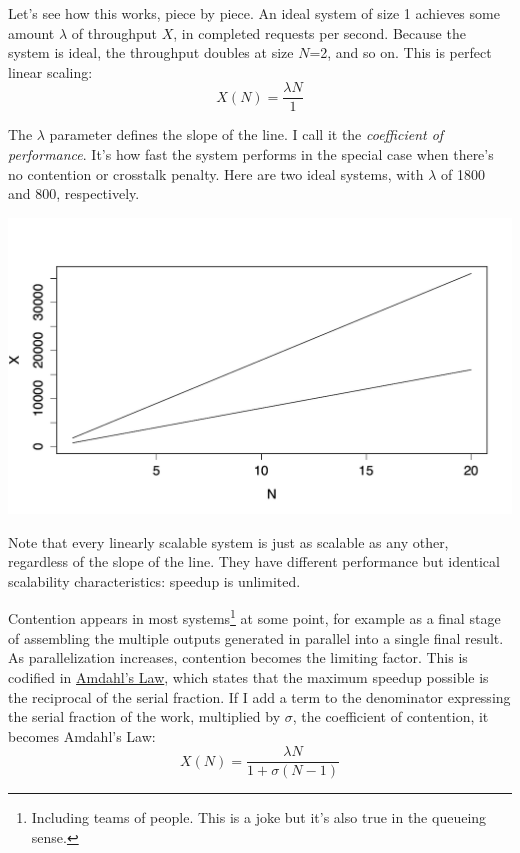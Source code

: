 \documentclass{vivid_layout}
\begin{document}
Let's see how this works, piece by piece. An ideal system of size 1
achieves some amount $\lambda$ of throughput $X$, in completed requests per
second. Because the system is ideal, the throughput doubles at size $N$=2, and so
on. This is perfect linear scaling:
\begin{equation}
X(N) = \frac{\lambda N}{1}
\label{linear}
\end{equation}

The $\lambda$ parameter defines the slope of the line. I call it the {\itshape
coefficient of performance}. It's how fast the system performs in the special
case when there's no contention or crosstalk penalty.
Here are two ideal systems, with $\lambda$ of 1800 and 800, respectively.
\begin{center}
\includegraphics[width=.85\linewidth]{scalability/ideal-linear}
\end{center}

Note that every linearly scalable system is just as scalable as any other,
regardless of the slope of the line. They have different performance but
identical scalability characteristics: speedup is unlimited. 

Contention appears in most systems\footnote{Including teams of people. This is a
joke but it's also true in the queueing sense.} at
some point, for example as a final stage of assembling the multiple outputs
generated in parallel into a single final result. As parallelization increases,
contention becomes the limiting factor. This is codified in
\href{https://en.wikipedia.org/wiki/Amdahl\%27s\_law}{Amdahl's Law}, which
states that the maximum speedup possible is the reciprocal of the serial
fraction. If I add a term to the denominator expressing the serial fraction of
the work, multiplied by $\sigma$, the coefficient of contention, it becomes
Amdahl's Law:
\begin{equation}
X(N) = \frac{\lambda N}{1 + \sigma(N-1)}
\label{amdahl}
\end{equation}
\end{document}
